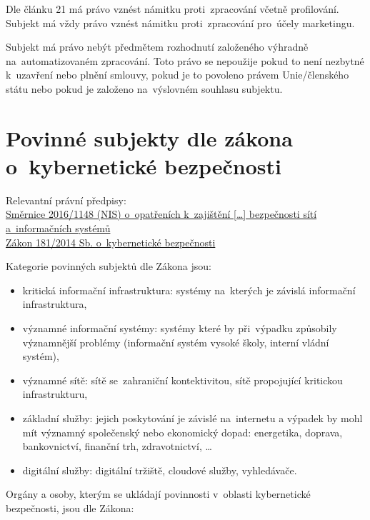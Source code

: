 Dle článku 21 má právo vznést námitku proti~zpracování včetně profilování.
Subjekt má vždy právo vznést námitku proti~zpracování pro~účely marketingu.

Subjekt má právo nebýt předmětem rozhodnutí založeného výhradně na~automatizovaném zpracování.
Toto právo se nepoužije pokud to není nezbytné k~uzavření nebo plnění smlouvy, pokud je to povoleno právem Unie/členského státu nebo pokud je založeno na~výslovném souhlasu subjektu.


\clearpage
\section{Povinné subjekty dle zákona o~kybernetické bezpečnosti}

{}Relevantní právní předpisy:
\\\href{https://eur-lex.europa.eu/legal-content/CS/TXT/?uri=uriserv:OJ.L_.2016.194.01.0001.01.CES
}{Směrnice 2016/1148 (NIS) o~opatřeních k~zajištění [\dots] bezpečnosti sítí a~informačních systémů}
\\\href{https://www.zakonyprolidi.cz/cs/2014-181}{Zákon 181/2014 Sb. o~kybernetické bezpečnosti}

Kategorie povinných subjektů dle Zákona jsou:

\begin{itemize}
\item kritická informační infrastruktura: systémy na~kterých je závislá informační infrastruktura,
\item významné informační systémy: systémy které by při~výpadku způsobily významnější problémy (informační systém vysoké školy, interní vládní systém),
\item významné sítě: sítě se~zahraniční kontektivitou, sítě propojující kritickou infrastrukturu,
\item základní služby: jejich poskytování je závislé na~internetu a výpadek by mohl mít významný společenský nebo ekonomický dopad: energetika, doprava, bankovnictví, finanční trh, zdravotnictví, \dots
\item digitální služby: digitální tržiště, cloudové služby, vyhledávače.
\end{itemize}

Orgány a osoby, kterým se ukládají povinnosti v~oblasti kybernetické bezpečnosti, jsou dle Zákona:

